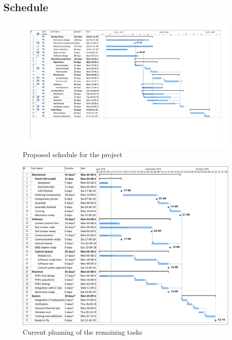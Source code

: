 \begin{landscape}

\subsection{Schedule}
\begin{figure}[H]

\includegraphics[scale=0.65]{3-project-planning/img/Gantt1_15072019.pdf}
\caption{Proposed schedule for the project}
\label{GanttChart}
\end{figure}

\begin{figure}[H]
	\includegraphics[scale=0.65]{3-project-planning/img/Gantt_2.pdf}
	\caption{Current planning of the remaining tasks}
	\label{Grantt2}
\end{figure}
\end{landscape}
